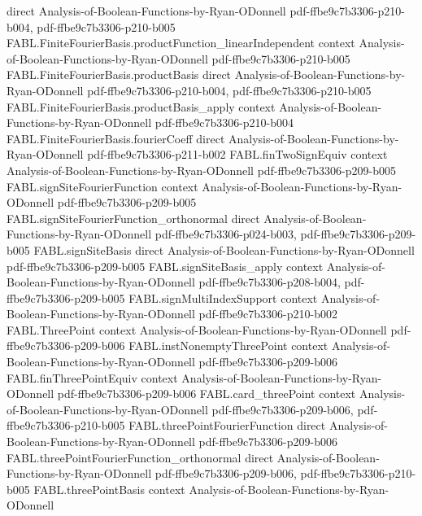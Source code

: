 \begin{theorem}
  {direct}
  {Analysis-of-Boolean-Functions-by-Ryan-ODonnell}
  {pdf-ffbe9c7b3306-p210-b004,
    pdf-ffbe9c7b3306-p210-b005}
\proofstep
  {FABL.FiniteFourierBasis.productFunction_linearIndependent}
  {context}
  {Analysis-of-Boolean-Functions-by-Ryan-ODonnell}
  {pdf-ffbe9c7b3306-p210-b005}
\proofstep
  {FABL.FiniteFourierBasis.productBasis}
  {direct}
  {Analysis-of-Boolean-Functions-by-Ryan-ODonnell}
  {pdf-ffbe9c7b3306-p210-b004,
    pdf-ffbe9c7b3306-p210-b005}
\proofstep
  {FABL.FiniteFourierBasis.productBasis_apply}
  {context}
  {Analysis-of-Boolean-Functions-by-Ryan-ODonnell}
  {pdf-ffbe9c7b3306-p210-b004}
\proofstep
  {FABL.FiniteFourierBasis.fourierCoeff}
  {direct}
  {Analysis-of-Boolean-Functions-by-Ryan-ODonnell}
  {pdf-ffbe9c7b3306-p211-b002}
\proofstep
  {FABL.finTwoSignEquiv}
  {context}
  {Analysis-of-Boolean-Functions-by-Ryan-ODonnell}
  {pdf-ffbe9c7b3306-p209-b005}
\proofstep
  {FABL.signSiteFourierFunction}
  {context}
  {Analysis-of-Boolean-Functions-by-Ryan-ODonnell}
  {pdf-ffbe9c7b3306-p209-b005}
\proofstep
  {FABL.signSiteFourierFunction_orthonormal}
  {direct}
  {Analysis-of-Boolean-Functions-by-Ryan-ODonnell}
  {pdf-ffbe9c7b3306-p024-b003,
    pdf-ffbe9c7b3306-p209-b005}
\proofstep
  {FABL.signSiteBasis}
  {direct}
  {Analysis-of-Boolean-Functions-by-Ryan-ODonnell}
  {pdf-ffbe9c7b3306-p209-b005}
\proofstep
  {FABL.signSiteBasis_apply}
  {context}
  {Analysis-of-Boolean-Functions-by-Ryan-ODonnell}
  {pdf-ffbe9c7b3306-p208-b004,
    pdf-ffbe9c7b3306-p209-b005}
\proofstep
  {FABL.signMultiIndexSupport}
  {context}
  {Analysis-of-Boolean-Functions-by-Ryan-ODonnell}
  {pdf-ffbe9c7b3306-p210-b002}
\proofstep
  {FABL.ThreePoint}
  {context}
  {Analysis-of-Boolean-Functions-by-Ryan-ODonnell}
  {pdf-ffbe9c7b3306-p209-b006}
\proofstep
  {FABL.instNonemptyThreePoint}
  {context}
  {Analysis-of-Boolean-Functions-by-Ryan-ODonnell}
  {pdf-ffbe9c7b3306-p209-b006}
\proofstep
  {FABL.finThreePointEquiv}
  {context}
  {Analysis-of-Boolean-Functions-by-Ryan-ODonnell}
  {pdf-ffbe9c7b3306-p209-b006}
\proofstep
  {FABL.card_threePoint}
  {context}
  {Analysis-of-Boolean-Functions-by-Ryan-ODonnell}
  {pdf-ffbe9c7b3306-p209-b006,
    pdf-ffbe9c7b3306-p210-b005}
\proofstep
  {FABL.threePointFourierFunction}
  {direct}
  {Analysis-of-Boolean-Functions-by-Ryan-ODonnell}
  {pdf-ffbe9c7b3306-p209-b006}
\proofstep
  {FABL.threePointFourierFunction_orthonormal}
  {direct}
  {Analysis-of-Boolean-Functions-by-Ryan-ODonnell}
  {pdf-ffbe9c7b3306-p209-b006,
    pdf-ffbe9c7b3306-p210-b005}
\proofstep
  {FABL.threePointBasis}
  {context}
  {Analysis-of-Boolean-Functions-by-Ryan-ODonnell}

\end{theorem}

